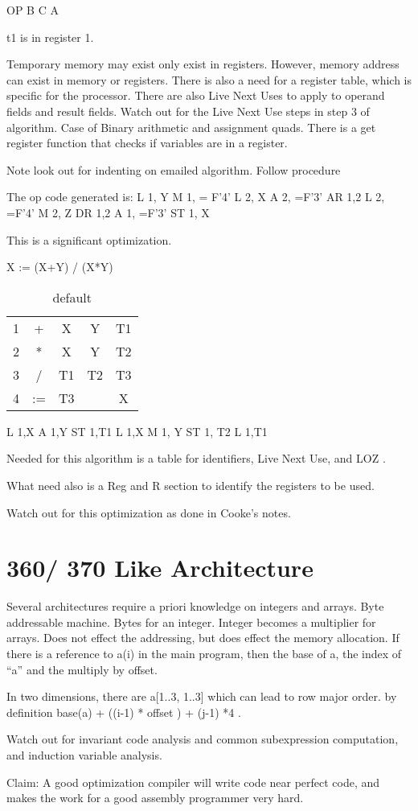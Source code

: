 \documentclass[11pt]{article}
\begin{document}
OP B C A

t1 is in register 1.  



Temporary memory may exist only exist in registers.  However, memory address can exist in memory or registers.  There is also a need for a register table, which is specific for the processor.   There are also Live Next Uses to apply to operand fields and result fields. Watch out for the Live Next Use steps in step 3 of algorithm.  Case of Binary arithmetic and assignment quads.    There is a get register function that checks if variables are in a register.  

Note look out for indenting on emailed algorithm.  Follow procedure 


The op code generated is:
L	1, Y
M	1, = F'4'
L	2, X
A	2, =F'3'
AR	1,2
L	2, =F'4'
M	2, Z
DR	1,2
A	1, =F'3'
ST	1, X

This is a significant optimization.  

X := (X+Y) / (X*Y)

\begin{table}[htdp]
\caption{default}
\begin{center}
\begin{tabular}{|c|c|c|c|c|}
1 & + & X & Y & T1 \\
2 & * & X & Y & T2 \\
3 & / & T1 & T2 & T3 \\
4 & := & T3 &  & X \\
\end{tabular}
\end{center}
\label{default}
\end{table}%

L	1,X
A	1,Y
ST	1,T1
L	1,X
M	1, Y
ST	1, T2
L	1,T1


Needed for this algorithm is a table for identifiers, Live Next Use, and LOZ .  

What need also is a Reg  and R section to identify the registers to be used.  

Watch out for this optimization as done in Cooke's notes.  

\section { 360/ 370 Like Architecture }
Several architectures require a priori knowledge on integers and arrays.  Byte addressable machine.  Bytes for an integer.  Integer becomes a multiplier for arrays.  Does not effect the addressing, but does effect the memory allocation.  If there is a reference to a(i) in the main program, then the base of a, the index of ``a'' and the multiply by offset.  

In two dimensions, there are a[1..3, 1..3] which can lead to row major order.  by definition base(a) + ((i-1) * offset ) + (j-1) *4 .  


Watch out for invariant code analysis and common subexpression computation, and induction variable analysis.  

Claim:  A good optimization compiler will write code near perfect code, and makes the work for a good assembly programmer very hard.  

 
\end{document}
